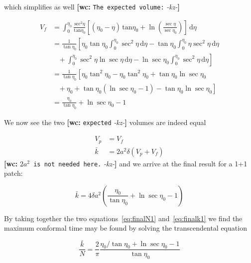 \documentclass[preprint,notitlepage,amsmath,amssymb,floatfix]{revtex4-1}
\newcommand{\XXX}[3]{{\bf [#1: } {\tt #3} {\it -#2-}{\bf ]}}
\begin{document}
\noindent which simplifies as well \XXX{wc}{kz}{The expected volume:}

\begin{equation}
\begin{split}
V_f &= \int_0^{\eta_0} \! \frac{\mathrm{sec}^2\eta}{\mathrm{tan}\eta_0} \left[ (\eta_0 - \eta) \, \mathrm{tan}\eta_0 + \ln\left(\frac{\sec\eta}{\sec\eta_0}\right) \right] \, \mathrm{d}\eta \\
  &= \frac{1}{\tan\eta_0} \left[ \eta_0\tan\eta_0 \int_0^{\eta_0} \! \sec^2\eta \, \mathrm{d}\eta - \tan\eta_0 \int_0^{\eta_0} \! \eta\sec^2\eta \, \mathrm{d}\eta \right. \\ & \left.\,\,\,\,\, + \int_0^{\eta_0} \! \sec^2\eta\ln\sec\eta \, \mathrm{d}\eta - \ln\sec\eta_0 \int_0^{\eta_0} \! \sec^2\eta \, \mathrm{d}\eta \right] \\
  &= \frac{1}{\tan\eta_0} \left[ \eta_0\tan^2\eta_0 - \eta_0\tan^2\eta_0 + \tan\eta_0\ln\sec\eta_0 \right. \\ & \left. \,\,\,\,\, + \eta_0 + \tan\eta_0\left(\ln\sec\eta_0 - 1\right) - \tan\eta_0\ln\sec\eta_0 \right] \\
  &= \frac{\eta_0}{\tan\eta_0} + \ln\sec\eta_0 - 1
\end{split}
\end{equation}

\noindent We now see the two \XXX{wc}{kz}{expected} volumes are indeed equal

\begin{equation}
\begin{split}
V_p &= V_f \\
\bar{k} &= 2a^2\delta \left( V_p + V_f \right)
\end{split}
\end{equation}
\XXX{wc}{kz}{$2a^2$ is not needed here.}
\noindent and we arrive at the final result for a 1+1 patch:

\begin{equation}
\label{eq:finalk1}
\bar k = 4 \delta a^2 \left( \frac{\eta_0}{\tan\eta_0} + \ln\sec\eta_0 - 1 \right)
\end{equation}

\noindent By taking together the two equations~\eqref{eq:finalN1} and~\eqref{eq:finalk1} we find the maximum conformal time may be found by solving the transcendental equation

\begin{equation}
\label{eq:trans1}
\frac{\bar k}{N} = \frac{2}{\pi}\frac{\eta_0 / \tan\eta_0 + \ln\sec\eta_0 - 1}{\tan\eta_0}
\end{equation}
\end{document}
